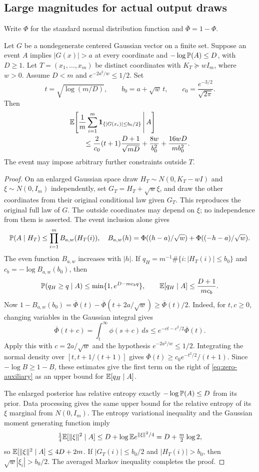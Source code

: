 \subsection{Large magnitudes for actual output draws}
Write $\Phi$ for the standard normal distribution function and
$\overline\Phi=1-\Phi$.
\begin{lemma}\label{lem:zero-auxiliary}
Let $G$ be a nondegenerate centered Gaussian vector on a finite set. Suppose an event $A$ implies $|G(x)|>a$ at every coordinate and $-\log\mathbb P(A)\le D$, with $D\ge1$. Let $T=(x_1,\ldots,x_m)$ be distinct coordinates with $K_T\succeq wI_m$, where $w>0$. Assume $D<m$ and $e^{-2a^2/w}\le1/2$. Set
\[
 t=\sqrt{\log(m/D)},\qquad b_0=a+\sqrt w\,t,\qquad c_0=\frac{e^{-3/2}}{\sqrt{2\pi}}.
\]
Then
\begin{align}\label{eq:zero-auxiliary}
 &\mathbb E\!\left[\frac1m\sum_{i=1}^m\mathbf1_{\{|G(x_i)|\le b_0/2\}}\,\middle|\,A\right]\\
 &\qquad\le \frac2{c_0}(t+1)\frac{D+1}{\sqrt{mD}}+\frac{8w}{b_0^2}+\frac{16wD}{mb_0^2}.\notag
\end{align}
The event may impose arbitrary further constraints outside $T$.
\end{lemma}
\begin{proof}
On an enlarged Gaussian space draw $H_T\sim N(0,K_T-wI)$ and $\xi\sim N(0,I_m)$ independently, set $G_T=H_T+\sqrt w\xi$, and draw the other coordinates from their original conditional law given $G_T$. This reproduces the original full law of $G$. The outside coordinates may depend on $\xi$; no independence from them is asserted. The event inclusion alone gives
\[
 \mathbb P(A\mid H_T)\le\prod_{i=1}^m B_{a,w}(H_T(i)),\quad
 B_{a,w}(h)=\Phi((h-a)/\sqrt w)+\Phi((-h-a)/\sqrt w).
\]
The even function $B_{a,w}$ increases with $|h|$. If $q_H=m^{-1}\#\{i:|H_T(i)|\le b_0\}$ and $c_b=-\log B_{a,w}(b_0)$, then
\[
 \mathbb P(q_H\ge q\mid A)\le\min\{1,e^{D-mc_bq}\},\qquad
 \mathbb E[q_H\mid A]\le\frac{D+1}{mc_b}.
\]
Now $1-B_{a,w}(b_0)=\overline\Phi(t)-\overline\Phi(t+2a/\sqrt w)\ge\overline\Phi(t)/2$. Indeed, for $t,c\ge0$, changing variables in the Gaussian integral gives
\[
 \overline\Phi(t+c)=\int_t^\infty\phi(s+c)\,ds
 \le e^{-ct-c^2/2}\overline\Phi(t).
\]
Apply this with $c=2a/\sqrt w$ and the hypothesis
$e^{-2a^2/w}\le1/2$. Integrating the normal density over $[t,t+1/(t+1)]$ gives $\overline\Phi(t)\ge c_0 e^{-t^2/2}/(t+1)$. Since $-\log B\ge1-B$, these estimates give the first term on the right of \eqref{eq:zero-auxiliary} as an upper bound for $\mathbb E[q_H\mid A]$.

The enlarged posterior has relative entropy exactly $-\log\mathbb P(A)\le D$ from its prior. Data processing gives the same upper bound for the relative entropy of its $\xi$ marginal from $N(0,I_m)$. The entropy variational inequality and the Gaussian moment generating function imply
\[
 \tfrac14\mathbb E[\|\xi\|^2\mid A]\le D+\log\mathbb E e^{\|\xi\|^2/4}=D+\tfrac m2\log2,
\]
so $\mathbb E[\|\xi\|^2\mid A]\le4D+2m$. If $|G_T(i)|\le b_0/2$ and $|H_T(i)|>b_0$, then $\sqrt w|\xi_i|>b_0/2$. The averaged Markov inequality completes the proof.
\end{proof}


